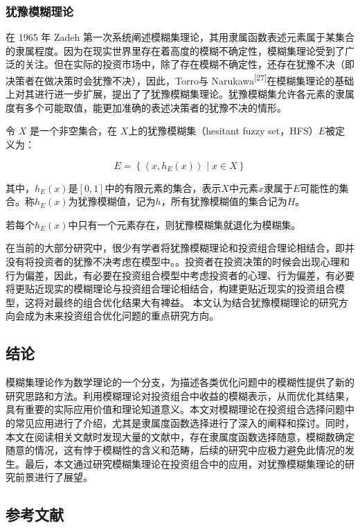 \documentclass[]{article}
\begin{document}
\hypertarget{header-n77}{%
\subsubsection{犹豫模糊理论}\label{header-n77}}

在 1965 年 Zadeh
第一次系统阐述模糊集理论，其用隶属函数表述元素属于某集合的隶属程度。因为在现实世界里存在着高度的模糊不确定性，模糊集理论受到了广泛的关注。但在实际的投资市场中，除了存在模糊不确定性，还存在犹豫不决（即决策者在做决策时会犹豫不决），因此，Torro与
Narukawa\textsuperscript{{[}27{]}}在模糊集理论的基础上对其进行进一步扩展，提出了了犹豫模糊集理论。犹豫模糊集允许各元素的隶属度有多个可能取值，能更加准确的表述决策者的犹豫不决的情形。

令 \(X\) 是一个非空集合，在 \(X\)上的犹豫模糊集（hesitant fuzzy
set，HFS）\(E\)被定义为：

\[E=\left\{\left\langle x, h_{E}(x)\right\rangle \mid x \in X\right\}\]

其中，\(h_{E}(x)\)是\([0,1]\)中的有限元素的集合，表示\(X\)中元素\(x\)隶属于\(E\)可能性的集合。称\(h_{E}(x)\)为犹豫模糊值，记为\(h\)，所有犹豫模糊值的集合记为\(H\)。

若每个\(h_{E}(x)\)中只有一个元素存在，则犹豫模糊集就退化为模糊集。

在当前的大部分研究中，很少有学者将犹豫模糊理论和投资组合理论相结合，即并没有将投资者的犹豫不决考虑在模型中。。投资者在投资决策的时候会出现心理和行为偏差，因此，有必要在投资组合模型中考虑投资者的心理、行为偏差，有必要将更贴近现实的模糊理论与投资组合理论相结合，构建更贴近现实的投资组合模型，这将对最终的组合优化结果大有裨益。
本文认为结合犹豫模糊理论的研究方向会成为未来投资组合优化问题的重点研究方向。

\hypertarget{header-n84}{%
\subsection{结论}\label{header-n84}}

模糊集理论作为数学理论的一个分支，为描述各类优化问题中的模糊性提供了新的研究思路和方法。利用模糊理论对投资组合中收益的模糊表示，从而优化其结果，具有重要的实际应用价值和理论知道意义。本文对模糊理论在投资组合选择问题中的常见应用进行了介绍，尤其是隶属度函数选择进行了深入的阐释和探讨。同时，本文在阅读相关文献时发现大量的文献中，存在隶属度函数选择随意，模糊数确定随意的情况，这有悖于模糊性的含义和范畴，后续的研究中应极力避免此情况的发生。最后，本文通过研究模糊集理论在投资组合中的应用，对犹豫模糊集理论的研究前景进行了展望。

\hypertarget{header-n86}{%
\subsection{参考文献}\label{header-n86}}
\end{document}
